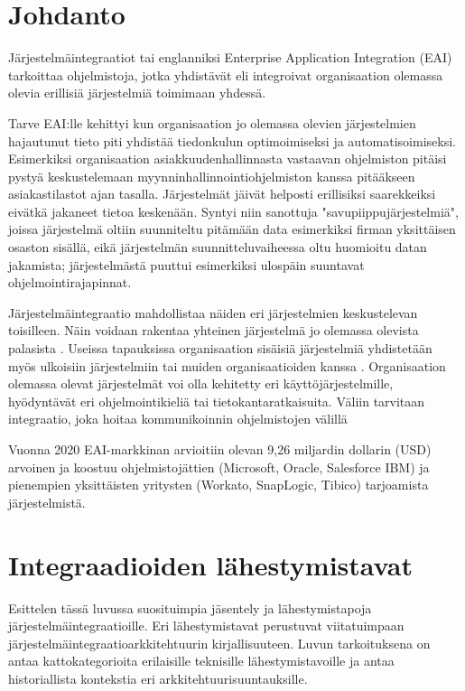 
\chapter{Johdanto}


Järjestelmäintegraatiot tai englanniksi Enterprise Application Integration (EAI) tarkoittaa ohjelmistoja, 
jotka yhdistävät eli integroivat organisaation olemassa olevia erillisiä järjestelmiä toimimaan yhdessä.

Tarve EAI:lle kehittyi kun organisaation jo olemassa olevien
järjestelmien hajautunut tieto piti yhdistää tiedonkulun optimoimiseksi ja
automatisoimiseksi. Esimerkiksi organisaation asiakkuudenhallinnasta vastaavan ohjelmiston
pitäisi pystyä keskustelemaan myynninhallinnointiohjelmiston kanssa pitääkseen
asiakastilastot ajan tasalla. 
Järjestelmät jäivät helposti erillisiksi saarekkeiksi eivätkä jakaneet tietoa keskenään. 
Syntyi niin sanottuja "savupiippujärjestelmiä", joissa järjestelmä oltiin suunniteltu pitämään data esimerkiksi firman yksittäisen osaston sisällä, eikä järjestelmän suunnitteluvaiheessa oltu huomioitu datan jakamista; järjestelmästä puuttui esimerkiksi ulospäin suuntavat ohjelmointirajapinnat. 

Järjestelmäintegraatio mahdollistaa näiden eri järjestelmien keskustelevan toisilleen. Näin voidaan rakentaa yhteinen järjestelmä jo olemassa olevista palasista \citep[sivu 15]{linthicum2000enterprise}. Useissa tapauksissa organisaation sisäisiä järjestelmiä yhdistetään myös ulkoisiin järjestelmiin tai muiden organisaatioiden kanssa \citep{Johannesson2001}.
Organisaation olemassa olevat järjestelmät voi olla kehitetty eri käyttöjärjestelmille, hyödyntävät eri
ohjelmointikieliä tai tietokantaratkaisuita. Väliin tarvitaan integraatio, joka hoitaa
kommunikoinnin ohjelmistojen välillä


Vuonna 2020 EAI-markkinan arvioitiin olevan 9,26 miljardin dollarin (USD) arvoinen \citep{mordorintelligence} ja koostuu ohjelmistojättien (Microsoft, Oracle, Salesforce IBM) ja pienempien yksittäisten yritysten (Workato, SnapLogic, Tibico) tarjoamista järjestelmistä.


\chapter{Integraadioiden lähestymistavat}

Esittelen tässä luvussa suosituimpia jäsentely ja lähestymistapoja järjestelmäintegraatioille. Eri lähestymistavat perustuvat viitatuimpaan järjestelmäintegraatioarkkitehtuurin kirjallisuuteen. Luvun tarkoituksena on antaa kattokategorioita erilaisille teknisille lähestymistavoille ja antaa historiallista kontekstia eri arkkitehtuurisuuntauksille.

